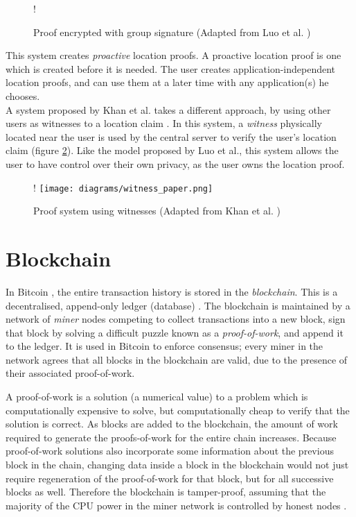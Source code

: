 \begin{figure}[H]
\resizebox {\columnwidth} {!} {}
\caption{Proof encrypted with group signature (Adapted from Luo et al. \cite{luo})}
\label{fig:luo_transaction}
\end{figure}

This system creates \textit{proactive} location proofs. A proactive location proof is one which is created before it is needed. The user creates application-independent location proofs, and can use them at a later time with any application(s) he chooses.
\\

A system proposed by Khan et al. takes a different approach, by using other users as witnesses to a location claim \cite{khan}. In this system, a \textit{witness} physically located near the user is used by the central server to verify the user's location claim (figure \ref{fig:witness_paper}). Like the model proposed by Luo et al., this system allows the user to have control over their own privacy, as the user owns the location proof.

\begin{figure}[H]
\begin{center}
 {!} {\texttt{[image: diagrams/witness\_paper.png]}}
\caption{Proof system using witnesses (Adapted from Khan et al. \cite{khan})}
\label{fig:witness_paper}
\end{center}
\end{figure}

\section{Blockchain}
In Bitcoin \cite{bitcoin}, the entire transaction history is stored in the \textit{blockchain}. This is a decentralised, append-only ledger (database) \cite{blueprint}. The blockchain is maintained by a network of \textit{miner} nodes competing to collect transactions into a new block, sign that block by solving a difficult puzzle known as a \textit{proof-of-work}, and append it to the ledger. It is used in Bitcoin to enforce consensus; every miner in the network agrees that all blocks in the blockchain are valid, due to the presence of their associated proof-of-work.

A proof-of-work is a solution (a numerical value) to a problem which is computationally expensive to solve, but computationally cheap to verify that the solution is correct. As blocks are added to the blockchain, the amount of work required to generate the proofs-of-work for the entire chain increases. Because proof-of-work solutions also incorporate some information about the previous block in the chain, changing data inside a block in the blockchain would not just require regeneration of the proof-of-work for that block, but for all successive blocks as well. Therefore the blockchain is tamper-proof, assuming that the majority of the CPU power in the miner network is controlled by  honest nodes \cite{bitcoin}.

